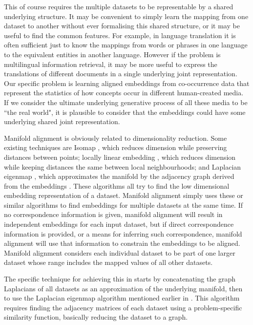 This of course requires the multiple datasets to be representable by a shared underlying structure. It may be convenient to simply learn the mapping from one dataset to another without ever formalising this shared structure, or it may be useful to find the common features. For example, in language translation it is often sufficient just to know the mappings from words or phrases in one language to the equivalent entities in another language. However if the problem is multilingual information retrieval, it may be more useful to express the translations of different documents in a single underlying joint representation. Our specific problem is learning aligned embeddings from co-occurrence data that represent the statistics of how concepts occur in different human-created media. If we consider the ultimate underlying generative process of all these media to be ``the real world", it is plausible to consider that the embeddings could have some underlying shared joint representation. 

Manifold alignment is obviously related to dimensionality reduction. Some existing techniques are Isomap \cite{Isomap}, which reduces dimension while preserving distances between points; locally linear embedding \cite {LocallyLinearEmbedding}, which reduces dimension while keeping distances the same between local neighbourhoods; and Laplacian eigenmap \cite{LaplacianEigenmaps}, which approximates the manifold by the adjacency graph derived from the embeddings . These algorithms all try to find the low dimensional embedding representation of a dataset. Manifold alignment simply uses these or similar algorithms to find embeddings for multiple datasets at the same time. If no correspondence information is given, manifold alignment will result in independent embeddings for each input dataset, but if direct correspondence information is provided, or a means for inferring such correspondence, manifold alignment will use that information to constrain the embeddings to be aligned. Manifold alignment considers each individual dataset to be part of one larger dataset whose range includes the mapped values of all other datasets. 

The specific technique for achieving this in \cite{ManifoldLearningTheoryAndApplications} starts by concatenating the graph Laplacians of all datasets as an approximation of the underlying manifold, then to use the Laplacian eigenmap algorithm mentioned earlier in \cite{LaplacianEigenmaps}. This algorithm requires finding the adjacency matrices of each dataset using a problem-specific similarity function, basically reducing the dataset to a graph. 


